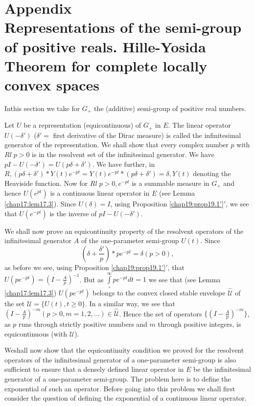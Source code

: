 
\chapter*{Appendix\\ Representations of the semi-group of positive
reals. Hille-Yosida Theorem for complete locally convex spaces} 


In\pageoriginale this section we take for $G_+$ the (additive)
semi-group of positive real numbers.

Let $U$ be a representation (equicontinuous) of $G_+$ in $E$. The
linear operator $U(-\delta')$ ($\delta'=$ first derivative of the
Dirac measure) is called the infinitesimal generator of the
representation. We shall show that every complex number $p$ with $Rl\;
p>0$ is in the resolvent set of the infinitesimal generator. We have
$pI-U(-\delta')=U(p\delta+\delta')$. We have further, in $R, (p\delta
+\delta')*Y(t) e^{-pt}=Y(t)e^{-pt}*(p\delta +\delta')=\delta, Y(t)$
denoting the Heaviside function. Now for $Rl\;p>0, e^{-pt}$ is a
summable measure in $G_+$ and hence $U(e^{pt})$ is a continuous linear
operator in $E$ (see Lemma \ref{chap17:lem17.3}).  Since
$U(\delta)=I$, using Proposition \ref{chap19:prop19.1'}$'$, we see that
$U(e^{-pt})$ is the inverse of $pI-U(-\delta')$. 

We shall now prove an equicontinuity property of the resolvent
operators of the infinitesimal generator $A$ of the one-parameter
semi-group $U(t)$. Since 
$$
(\delta +\frac{\delta'}{p})*p e^{-pt}=\delta(p>0),
$$
as before we see, using Proposition \ref{chap19:prop19.1'}$'$, that
$U(pe^{-pt})=(I-\frac{A}{p})^{-1}$. But as $\int\limits_\circ^\infty p
e^{-pt}dt=1$ we see that (see Lemma \ref{chap17:lem17.3})
$U(pe^{-pt})$ belongs to the convex closed stable envelope
$\overset{\frown}{\mathscr{U}}$ of the set $\mathscr{U}=\{U(t), t\geq
0\}$. In a similar way, we see that $(I-\frac{A}{p})^{-m} (p>0, m=1,
2,\ldots)\in\overset{\frown}{\mathscr{U}}$. Hence the set of operators
$\{(I-\frac{A}{p})^{-m}\}$, as $p$ runs through strictly positive
numbers and $m$ through positive integers, is equicontinuous (with
$\mathscr{U}$). 

We\pageoriginale shall now show that the equicontinuity condition we
proved for the resolvent operators of the infinitesimal generator of a
one-parameter semi-group is also sufficient to ensure that a densely
defined linear operator in $E$ be the infinitesimal generator of a
one-parameter semi-group. The problem here is to define the
exponential of such an operator. Before going into this problem we
shall first consider the question of defining the exponential of a
continuous linear operator. 


